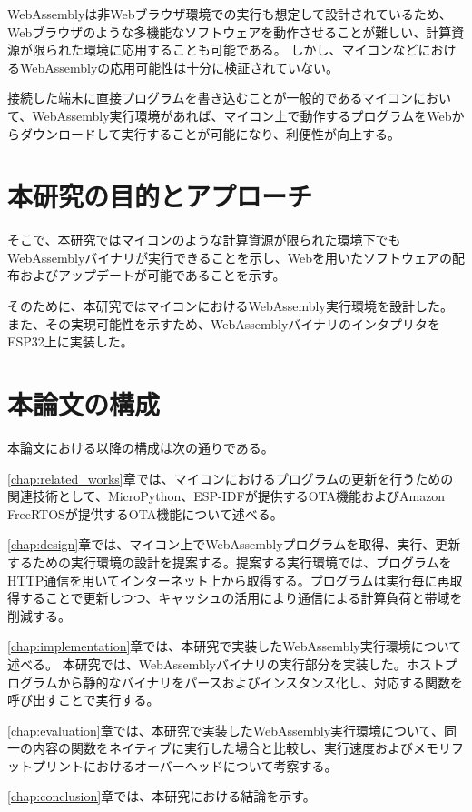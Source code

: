 WebAssemblyは非Webブラウザ環境での実行も想定して設計されているため、Webブラウザのような多機能なソフトウェアを動作させることが難しい、計算資源が限られた環境に応用することも可能である。
しかし、マイコンなどにおけるWebAssemblyの応用可能性は十分に検証されていない。

接続した端末に直接プログラムを書き込むことが一般的であるマイコンにおいて、WebAssembly実行環境があれば、マイコン上で動作するプログラムをWebからダウンロードして実行することが可能になり、利便性が向上する。

\section{本研究の目的とアプローチ}

そこで、本研究ではマイコンのような計算資源が限られた環境下でもWebAssemblyバイナリが実行できることを示し、Webを用いたソフトウェアの配布およびアップデートが可能であることを示す。

そのために、本研究ではマイコンにおけるWebAssembly実行環境を設計した。
また、その実現可能性を示すため、WebAssemblyバイナリのインタプリタをESP32上に実装した。

\section{本論文の構成}

本論文における以降の構成は次の通りである。

\ref{chap:related_works}章では、マイコンにおけるプログラムの更新を行うための関連技術として、MicroPython、ESP-IDFが提供するOTA機能およびAmazon FreeRTOSが提供するOTA機能について述べる。

\ref{chap:design}章では、マイコン上でWebAssemblyプログラムを取得、実行、更新するための実行環境の設計を提案する。提案する実行環境では、プログラムをHTTP通信を用いてインターネット上から取得する。プログラムは実行毎に再取得することで更新しつつ、キャッシュの活用により通信による計算負荷と帯域を削減する。

\ref{chap:implementation}章では、本研究で実装したWebAssembly実行環境について述べる。
本研究では、WebAssemblyバイナリの実行部分を実装した。ホストプログラムから静的なバイナリをパースおよびインスタンス化し、対応する関数を呼び出すことで実行する。

\ref{chap:evaluation}章では、本研究で実装したWebAssembly実行環境について、同一の内容の関数をネイティブに実行した場合と比較し、実行速度およびメモリフットプリントにおけるオーバーヘッドについて考察する。

\ref{chap:conclusion}章では、本研究における結論を示す。
